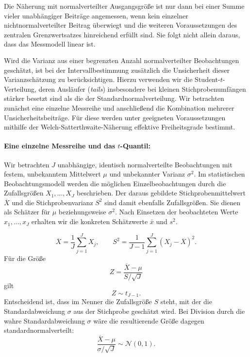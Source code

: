 Die Näherung mit normalverteilter Ausgangsgröße ist nur dann bei einer Summe vieler unabhängiger Beiträge angemessen, wenn kein einzelner nichtnormalverteilter Beitrag überwiegt und die weiteren Voraussetzungen des zentralen Grenzwertsatzes hinreichend erfüllt sind. Sie folgt nicht allein daraus, dass das Messmodell linear ist.

Wird die Varianz aus einer begrenzten Anzahl normalverteilter
Beobachtungen geschätzt, ist bei der Intervallbestimmung zusätzlich
die Unsicherheit dieser Varianzschätzung zu berücksichtigen.
Hierzu verwenden wir die Student-$t$-Verteilung, deren Ausläufer
(\textsl{tails}) insbesondere bei kleinen Stichprobenumfängen stärker
besetzt sind als die der Standardnormalverteilung.
Wir betrachten zunächst eine einzelne Messreihe und anschließend
die Kombination mehrerer Unsicherheitsbeiträge. Für diese werden
unter geeigneten Voraussetzungen mithilfe der
Welch-Satterthwaite-Näherung effektive Freiheitsgrade bestimmt.

\paragraph{Eine einzelne Messreihe und das $t$-Quantil:}

Wir betrachten $J$ unabhängige, identisch normalverteilte Beobachtungen
mit festem, unbekanntem Mittelwert $\mu$ und unbekannter Varianz
$\sigma^2$. Im statistischen Beobachtungsmodell werden die möglichen
Einzelbeobachtungen durch die Zufallsgrößen $X_1,\dots,X_J$ beschrieben.
Der daraus gebildete Stichprobenmittelwert $\overline X$ und die
Stichprobenvarianz $S^2$ sind damit ebenfalls Zufallsgrößen.
Sie dienen als Schätzer für $\mu$ beziehungsweise $\sigma^2$.
Nach Einsetzen der beobachteten Werte $x_1,\dots,x_J$ erhalten wir
die konkreten Schätzwerte $\bar x$ und $s^2$.

\begin{equation}
\overline X=\frac{1}{J}\sum_{j=1}^{J}X_j,
\qquad
S^2=\frac{1}{J-1}\sum_{j=1}^{J}(X_j-\overline X)^2.
\end{equation}
Für die Größe
\begin{equation}
Z=\frac{\overline X-\mu}{S/\sqrt J}
\end{equation}
gilt
\begin{equation}
Z\sim t_{J-1}.
\end{equation}
Entscheidend ist, dass im Nenner die Zufallsgröße $S$ steht,
mit der die Standardabweichung $\sigma$ aus der Stichprobe
geschätzt wird. Bei Division durch die wahre Standardabweichung
$\sigma$ wäre die resultierende Größe dagegen standardnormalverteilt:
\begin{equation}
\frac{\overline X-\mu}{\sigma/\sqrt J}
\sim\mathcal N(0,1).
\end{equation}

